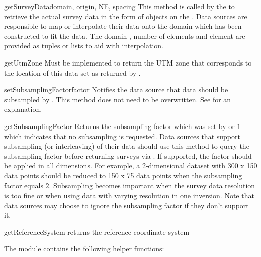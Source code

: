 \begin{methoddesc}[DataSource]{getSurveyData}{domain, origin, NE, spacing}
This method is called by the  to retrieve the actual survey
data in the form of \Data objects on the .
Data sources are responsible to map or interpolate their data onto the domain
which has been constructed to fit the data.
The domain , number of elements  and element
 are provided as tuples or lists to aid with interpolation.
\end{methoddesc}

\begin{methoddesc}[DataSource]{getUtmZone}{}
Must be implemented to return the UTM zone that corresponds to the location of
this data set as returned by .
\end{methoddesc}

\begin{methoddesc}[DataSource]{setSubsamplingFactor}{factor}
Notifies the data source that data should be subsampled by .
This method does not need to be overwritten.
See  for an explanation.
\end{methoddesc}

\begin{methoddesc}[DataSource]{getSubsamplingFactor}{}
Returns the subsampling factor which was set by 
or $1$ which indicates that no subsampling is requested.
Data sources that support subsampling (or interleaving) of their data should use
this method to query the subsampling factor before returning surveys via
. If supported, the factor should be applied in all
dimensions. For example, a 2-dimensional dataset with 300 x 150 data points
should be reduced to 150 x 75 data points when the subsampling factor equals $2$.
Subsampling becomes important when the survey data resolution is too fine or
when using data with varying resolution in one inversion.
Note that data sources may choose to ignore the subsampling factor if they
don't support it.
\end{methoddesc}

\begin{methoddesc}[DataSource]{getReferenceSystem}{}
returns the reference coordinate system
\end{methoddesc}

\vspace{1em}\noindent The  module contains the following helper
functions:

